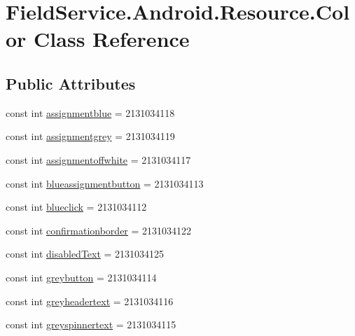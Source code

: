\hypertarget{class_field_service_1_1_android_1_1_resource_1_1_color}{\section{Field\+Service.\+Android.\+Resource.\+Color Class Reference}
\label{class_field_service_1_1_android_1_1_resource_1_1_color}
}
\subsection*{Public Attributes}
\begin{DoxyCompactItemize}
\item 
const int \hyperlink{class_field_service_1_1_android_1_1_resource_1_1_color_ae78c5259a1f444f3122b350cd5f3e45a}{assignmentblue} = 2131034118
\item 
const int \hyperlink{class_field_service_1_1_android_1_1_resource_1_1_color_a89677dcde376bf52d88f0248e1e4f6b6}{assignmentgrey} = 2131034119
\item 
const int \hyperlink{class_field_service_1_1_android_1_1_resource_1_1_color_af8dd2c4e622d7d0f08a95032f0276a64}{assignmentoffwhite} = 2131034117
\item 
const int \hyperlink{class_field_service_1_1_android_1_1_resource_1_1_color_ab870daaf0cf6308514d35d62c9034a5e}{blueassignmentbutton} = 2131034113
\item 
const int \hyperlink{class_field_service_1_1_android_1_1_resource_1_1_color_a6c00c91932b377b1394a212f17c6b3b6}{blueclick} = 2131034112
\item 
const int \hyperlink{class_field_service_1_1_android_1_1_resource_1_1_color_af6f8b291cbe1b4b62d931afd61a40fed}{confirmationborder} = 2131034122
\item 
const int \hyperlink{class_field_service_1_1_android_1_1_resource_1_1_color_a913c886d8405d053b3ee945c722c5f9d}{disabled\+Text} = 2131034125
\item 
const int \hyperlink{class_field_service_1_1_android_1_1_resource_1_1_color_a9b6c141924fe8c624101ab0ed6962f75}{greybutton} = 2131034114
\item 
const int \hyperlink{class_field_service_1_1_android_1_1_resource_1_1_color_a77279a83d3a46e3caabd68ff56da8949}{greyheadertext} = 2131034116
\item 
const int \hyperlink{class_field_service_1_1_android_1_1_resource_1_1_color_aea34bcdf7067aba37be4f61b5da27afe}{greyspinnertext} = 2131034115
\item 

\end{DoxyCompactItemize}
